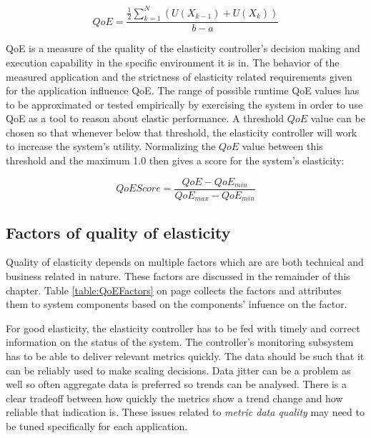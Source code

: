\documentclass[english]{tktltiki2}
\theoremstyle{definition}
\theoremstyle{remark}
\begin{document}
\begin{equation}
QoE = \frac{\frac{1}{2}\sum\limits_{k=1}^N (U(X_{k-1}) + U(X_{k}))}{b-a} 
\label{eq:qoefunctionnumericalfinal}
\end{equation}

QoE is a measure of the quality of the elasticity controller's decision making
and execution capability in the specific environment it is in. The behavior of
the measured application and the strictness of elasticity related requirements
given for the application influence QoE. The range of possible runtime QoE
values has to be approximated or tested empirically by exercising the system in
order to use QoE as a tool to reason about elastic performance. A threshold
$QoE$ value can be chosen so that whenever below that threshold, the elasticity
controller will work to increase the system's utility. Normalizing the $QoE$
value between this threshold and the maximum 1.0 then gives a score for the
system's elasticity:

\begin{equation}
	QoEScore = \frac{QoE - QoE_{min}}{QoE_{max} - QoE_{min}} 
	\label{eq:qoeScore}
\end{equation}


\subsection{Factors of quality of elasticity}

Quality of elasticity depends on multiple factors which are are both technical
and business related in nature. These factors are discussed in the remainder
of this chapter. Table \ref{table:QoEFactors} on page
\pageref{table:QoEFactors} collects the factors and attributes them to system
components based on the components' infuence on the factor.

For good elasticity, the elasticity controller has to be fed with timely and
correct information on the status of the system. The controller's monitoring
subsystem has to be able to deliver relevant metrics quickly. The data should be
such that it can be reliably used to make scaling decisions. Data jitter can be
a problem as well so often aggregate data is preferred so trends can be
analysed. There is a clear tradeoff between how quickly the metrics show a trend
change and how reliable that indication is. These issues related to
\textit{metric data quality} may need to be tuned specifically for each
application.
\end{document}
